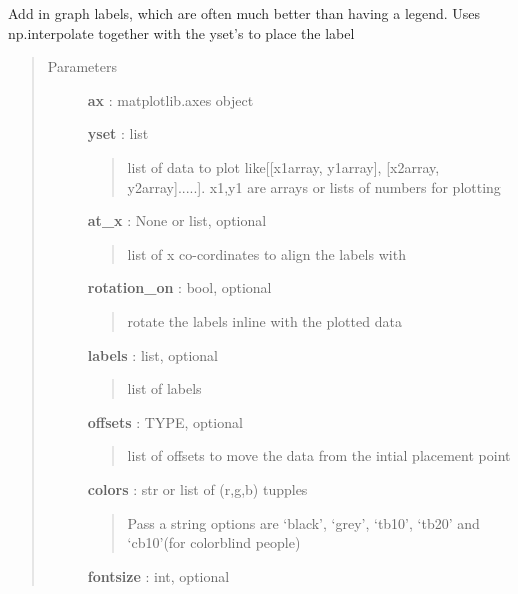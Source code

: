 \documentclass[letterpaper,10pt,english]{sphinxmanual}
\begin{document}
\begin{fulllineitems}
\label{pubplots:pubplots.plot.label_lines}
Add in graph labels, which are often much better than having a legend. Uses np.interpolate
together with the yset's to place the label
\begin{quote}\begin{description}
\item[{Parameters}] \leavevmode
\textbf{ax} : matplotlib.axes object

\textbf{yset} : list
\begin{quote}

list of data to plot like{[}{[}x1array, y1array{]}, {[}x2array, y2array{]}.....{]}.
x1,y1 are arrays or lists of numbers for plotting
\end{quote}

\textbf{at\_x} : None or list, optional
\begin{quote}

list of x co-cordinates to align the labels with
\end{quote}

\textbf{rotation\_on} : bool, optional
\begin{quote}

rotate the labels inline with the plotted data
\end{quote}

\textbf{labels} : list, optional
\begin{quote}

list of labels
\end{quote}

\textbf{offsets} : TYPE, optional
\begin{quote}

list of offsets to move the data from the intial placement point
\end{quote}

\textbf{colors} : str or list of (r,g,b) tupples
\begin{quote}

Pass a string options are `black', `grey', `tb10', `tb20' and `cb10'(for colorblind people)
\end{quote}

\textbf{fontsize} : int, optional

\end{description}\end{quote}

\end{fulllineitems}
\end{document}
